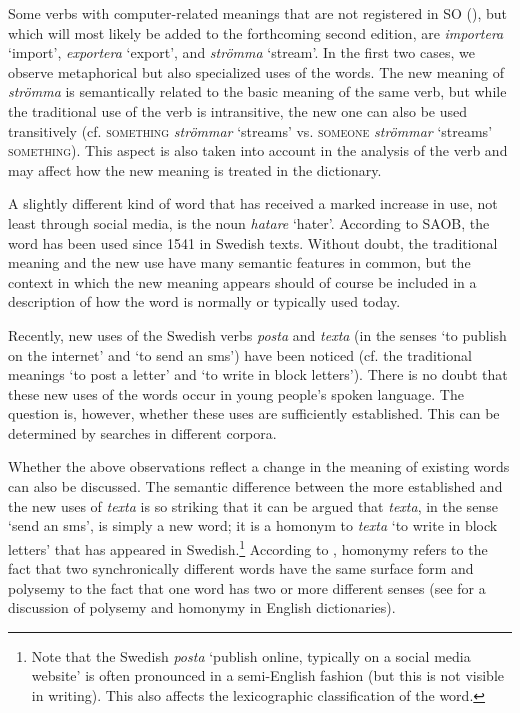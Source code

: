 \documentclass[output=paper]{langscibook}
\begin{document}
Some verbs with computer-related meanings that are not registered in SO (\citeyear{SO2009}), but which will most likely be added to the forthcoming second edition, are \emph{importera} `import', \emph{exportera} `export', and \emph{strömma} `stream'. In the first two cases, we observe metaphorical but also specialized uses of the words. The new meaning of \emph{strömma} is semantically related to the basic meaning of the same verb, but while the traditional use of the verb is intransitive, the new one can also be used transitively (cf. \textsc{something} \emph{strömmar} `streams' vs. \textsc{someone} \emph{strömmar} `streams' \textsc{something}). This aspect is also taken into account in the analysis of the verb and may affect how the new meaning is treated in the dictionary.

A slightly different kind of word that has received a marked increase in use, not least through social media, is the noun \emph{hatare} `hater'. According to SAOB, the word has been used since 1541 in Swedish texts. Without doubt, the traditional meaning and the new use have many semantic features in common, but the context in which the new meaning appears should of course be included in a description of how the word is normally or typically used today.

Recently, new uses of the Swedish verbs \emph{posta} and \emph{texta} (in the senses `to publish on the internet' and `to send an sms') have been noticed (cf. the traditional meanings `to post a letter' and `to write in block letters'). There is no doubt that these new uses of the words  occur in young people's spoken language. The question is, however, whether these uses are sufficiently established. This can be determined by searches in different corpora. 

Whether the above observations reflect a change in the meaning of existing words can also be discussed.  The semantic difference between the more established and the new uses of \emph{texta} is so striking that it can be argued that \emph{texta}, in the sense `send an sms', is simply a new word; it is a homonym to \emph{texta} `to write in block letters' that has appeared in Swedish.\footnote{Note that the Swedish \emph{posta} `publish online, typically on a social media website' is often pronounced in a semi-English fashion (but this is not visible in writing). This also affects the lexicographic classification of the word.}  According to  \citet[59]{ullman1962}, homonymy  refers to the fact that two synchronically different words have the same surface form and polysemy to the fact that one word has two or more different senses (see \citealt[280--282]{atkins2008} for a discussion of polysemy and homonymy in English dictionaries).
\end{document}
